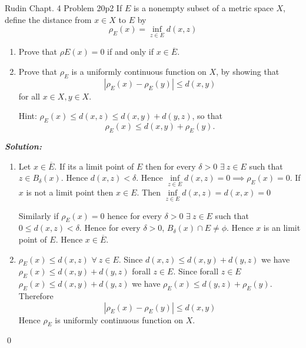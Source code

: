 \documentclass[a4paper, 11pt]{article}
\newcommand{\Qed}{\begin{flushright}\qed\end{flushright}}
\newcommand{\sol}[1]{\begin{solution}#1\end{solution}\Qed}
\newenvironment{solution}
{\textbf{\textit{Solution:}}\setlength{\parindent}{1cm}}
{}
\begin{document}
	
	
    \begin{problem}{Rudin Chapt. 4 Problem 20}{p2}
            If $E$ is a nonempty subset of a metric space $X$, define the distance from $x \in X$ to $E$ by
            $$\rho_{E}(x)=\inf _{z \in E} d(x, z)$$\begin{enumerate}[label=(\alph*)]
                    \item Prove that $\rho{E}(x)=0$ if and only if $x \in \overline{E}$.
                            \item Prove that $\rho_{E}$ is a uniformly continuous function on $X$, by showing that$$\left|\rho_{E}(x)-\rho_{E}(y)\right| \leq d(x, y)$$for all $x \in X, y \in X$.

Hint: $\rho_{E}(x) \leq d(x, z) \leq d(x, y)+d(y, z)$, so that$$\rho_{E}(x) \leq d(x, y)+\rho_{E}(y) .$$
\end{enumerate}
			\end{problem}
	
            \sol{\begin{enumerate}[label=(\alph*)]
                    \item Let $x\in \overline{E}$. If its a limit point of $E$ then for every $\delta>0$ $\exists\ z\in E$ such that $z\in B_{\delta}(x)$. Hence $d(x,z)<\delta$. Hence $\inf\limits_{z\in E} d(x,z)=0\implies \rho_E(x)=0$. If $x$ is not a limit point then $x\in E$. Then $\inf\limits_{z\in E} d(x,z)=d(x,x)=0$
                    
                    Similarly if $\rho_E(x)=0$ hence for every $\delta>0$ $\exists\  z\in E$ such that $0\leq d(x,z)< \delta$. Hence for every $\delta>0$, $B_{\delta}(x)\cap E\neq \phi$. Hence $x $ is an limit point of $E$. Hence $x\in \overline{E}$. 
                    \item $\rho_E(x)\leq d(x,z)$ $\forall\ z\in E$. Since $d(x,z)\leq d(x,y)+d(y,z)$ we have $\rho_E(x)\leq d(x,y)+d(y,z)$ forall $z\in E$. Since forall $z\in E$ $\rho_E(x)\leq d(x,y)+d(y,z)$ we have $\rho_E(x)\leq d(y,z)+\rho_E(y)$. Therefore $$|\rho_E(x)-\rho_E(y)|\leq d(x,y)$$Hence $\rho_E$ is uniformly continuous function on $X$.
                    \end{enumerate}}
	
\end{document}
